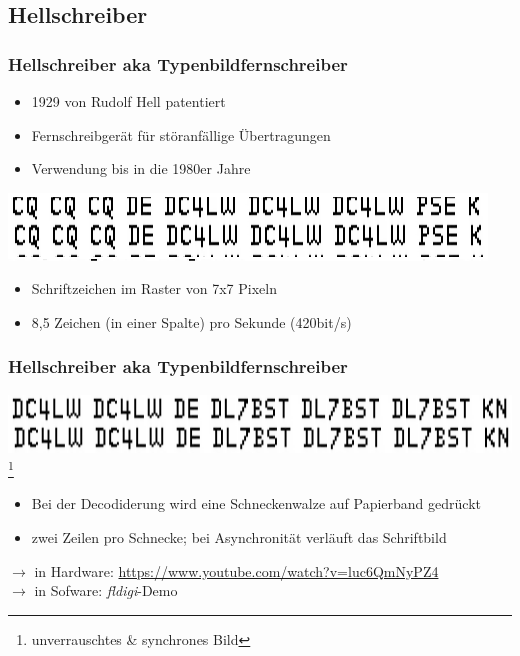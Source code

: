 \subsection[Hell]{Hellschreiber}

\begin{frame}
    \frametitle{Hellschreiber aka Typenbildfernschreiber}

    \begin{itemize}
        \item 1929 von Rudolf Hell patentiert
        \item Fernschreibgerät für störanfällige Übertragungen
        \item Verwendung bis in die 1980er Jahre
    \end{itemize}

    \begin{center}
      \includegraphics[width=.6\textwidth,height=.4\textheight,keepaspectratio]{e16/Hell_cq.png}
    \end{center}

    \begin{itemize}
        \item Schriftzeichen im Raster von 7x7 Pixeln
        \item 8,5 Zeichen (in einer Spalte) pro Sekunde (420bit/s)
    \end{itemize}

\end{frame}

\begin{frame}
    \frametitle{Hellschreiber aka Typenbildfernschreiber}

    \begin{center}
        \includegraphics[width=.6\textwidth,height=.4\textheight,keepaspectratio]{e16/Hell_ans.png}
        \footnote{unverrauschtes \& synchrones Bild}
    \end{center}

    \begin{itemize}
        \item Bei der Decodiderung wird eine Schneckenwalze auf Papierband gedrückt
        \item zwei Zeilen pro Schnecke; bei Asynchronität verläuft das Schriftbild
    \end{itemize}

    \bigskip

    $\rightarrow$ in Hardware: \url{https://www.youtube.com/watch?v=luc6QmNyPZ4} \\
    $\rightarrow$ in Sofware: \emph{fldigi}-Demo

\end{frame}

